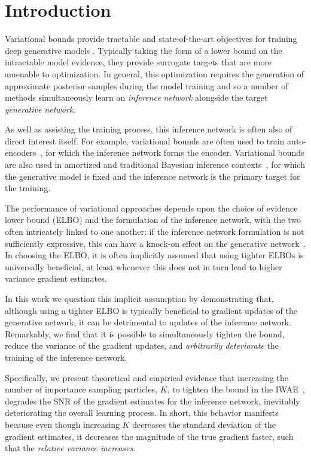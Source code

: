 
\section{Introduction}
\label{sec:intro}
Variational bounds provide tractable and state-of-the-art objectives for training deep generative models \citep{Kingma2014auto,Rezende2014stochastic}.  Typically taking
the form of a lower bound on the intractable model evidence, 
they provide surrogate targets that are more amenable to optimization.
In general, this optimization
requires the generation of approximate posterior samples during the model
training and so a number of methods simultaneously learn an \emph{inference
network} alongside the target \emph{generative network}. 

As well as assisting the training process, this inference network is often also of
direct interest itself.  For example, variational bounds are often used to train 
auto-encoders~\citep{Bourlard1988auto,Hinton1994autoencoders,Gregor2016towards,Chen2016variational},
for which the inference network forms the encoder.
Variational bounds are also used in amortized and traditional Bayesian inference 
 contexts~\cite{hoffman2013stochastic,ranganath2014black,
 	paige2016inference,le2017inference}, for which the generative model
 is fixed and the inference network is the primary target for the training.

The performance of variational approaches depends upon the choice of
evidence lower bound (\gls{ELBO})
and the formulation of the inference network, with the two often intricately linked to one another;
if the inference network formulation is not sufficiently expressive, this can have 
a knock-on effect on the generative network~\citep{Burda2016importance}.  
In choosing the \gls{ELBO}, it is often implicitly
assumed that using tighter \glspl{ELBO} is universally beneficial,
at least whenever this does not in turn lead to higher variance 
gradient estimates.


In this work we question this implicit assumption
by demonstrating that,
although using a tighter \gls{ELBO} is typically beneficial to gradient 
updates of the 
generative network, it can be detrimental to updates of
 the inference network.
Remarkably, we find that it is possible to simultaneously tighten the bound,
reduce the variance of the gradient updates, and \emph{arbitrarily deteriorate} the
training of the inference network.

Specifically, we present theoretical and empirical evidence that increasing the
number of importance sampling particles, $K$, to tighten the bound in the \gls{IWAE}~\citep{Burda2016importance}, degrades the \gls{SNR} of the
gradient estimates for the inference network, inevitably deteriorating the overall learning process.  In short, this behavior manifests because even though increasing
$K$ decreases the standard deviation of the gradient estimates, it decreases
the magnitude of the true gradient faster, such that the \emph{relative variance increases}.

